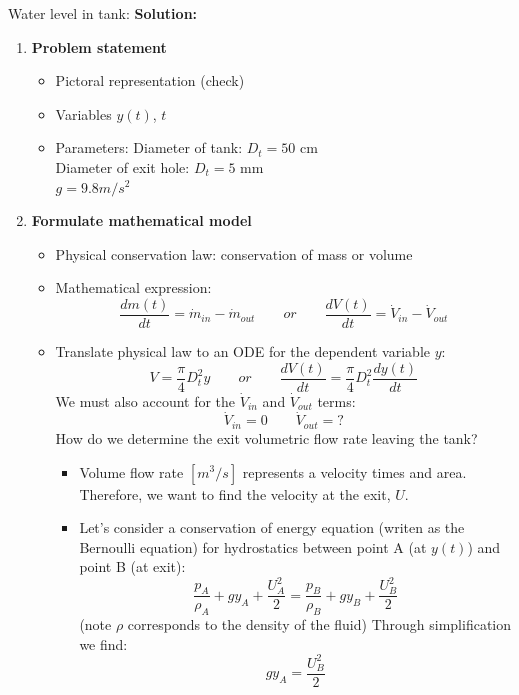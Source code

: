 \begin{exmp}{Water level in tank:}
 \textbf{Solution:} \\
\begin{enumerate}
\item \textbf{Problem statement}
\begin{itemize}
\item Pictoral representation (check)
\item Variables $y(t)$, $t$
\item Parameters: Diameter of tank: $D_t=50$ cm \\
  Diameter of exit hole: $D_t=5$ mm \\
  $g=9.8 m/s^2$
\end{itemize}
\item \textbf{Formulate mathematical model}
\begin{itemize}
\item Physical conservation law: conservation of mass or volume
\item Mathematical expression:
\begin{equation*}
\frac{d m(t)}{dt}= \dot{m}_{in}-\dot{m}_{out}\qquad or \qquad\frac{d V(t)}{dt}= \dot{V}_{in}-\dot{V}_{out}
\end{equation*}
\item Translate physical law to an ODE for the dependent variable $y$:
\begin{equation*}
V=\frac{\pi}{4}D^2_t y \qquad or \qquad \frac{d V(t)}{dt}= \frac{\pi}{4}D^2_t \frac{d y(t)}{dt} 
\end{equation*}
We must also account for the $\dot{V}_{in}$ and $\dot{V}_{out}$ terms:
\begin{equation*}
\dot{V}_{in}=0 \qquad \dot{V}_{out}=?
\end{equation*}
How do we determine the exit volumetric flow rate leaving the tank?
\begin{itemize}
\item Volume flow rate $[m^3/s]$ represents a velocity times and area. Therefore, we want to find the velocity at the exit, $U$.
\item Let's consider a conservation of energy equation (writen as the Bernoulli equation) for hydrostatics between point A (at $y(t)$) and point B (at exit):
\begin{equation*}
\frac{p_{A}}{\rho_A}+gy_A+\frac{U^2_A}{2}=
\frac{p_{B}}{\rho_B}+gy_B+\frac{U^2_B}{2}
\end{equation*}
(note $\rho$ corresponds to the density of the fluid) Through simplification we find:
\begin{equation*}
gy_A=\frac{U^2_B}{2}

\end{equation*}
\end{itemize}
\end{itemize}
\end{enumerate}
\end{exmp}

